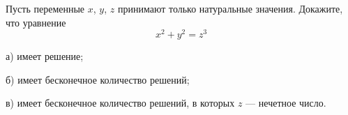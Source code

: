 
Пусть переменные $x$, $y$, $z$ принимают только натуральные значения. Докажите, что уравнение 
$$x^{2}+y^{2}=z^{3}
$$

а) имеет решение;

б) имеет бесконечное количество решений;

в) имеет бесконечное количество решений, в которых $z$ --- нечетное число.